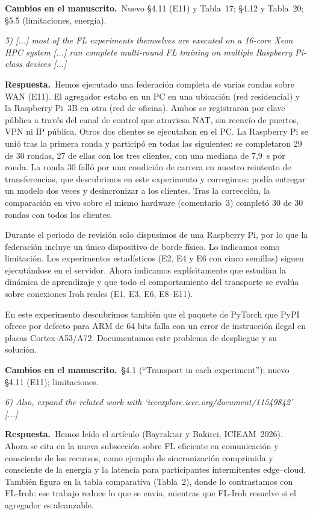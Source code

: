 \documentclass[11pt,a4paper]{article}
\newenvironment{comment}{\par\medskip\noindent\begin{minipage}{\linewidth}\color{blue!45!black}\itshape}{\end{minipage}\par}
\newcommand{\reply}{\par\smallskip\noindent\textbf{Respuesta.}~}
\newcommand{\changes}{\par\smallskip\noindent\textbf{Cambios en el manuscrito.}~}
\begin{document}
\changes Nuevo \S4.11 (E11) y Tabla~17; \S4.12 y Tabla~20; \S5.5 (limitaciones, energía).

\begin{comment}
5) [...] most of the FL experiments themselves are executed on a 16-core Xeon HPC system [...] run complete multi-round FL training on multiple Raspberry Pi-class devices [...]
\end{comment}
\reply Hemos ejecutado una federación completa de varias rondas sobre WAN (E11). El agregador estaba en un PC en una ubicación (red residencial) y la Raspberry Pi~3B en otra (red de oficina). Ambos se registraron por clave pública a través del canal de control que atraviesa NAT, sin reenvío de puertos, VPN ni IP pública. Otros dos clientes se ejecutaban en el PC. La Raspberry Pi se unió tras la primera ronda y participó en todas las siguientes: se completaron 29 de 30 rondas, 27 de ellas con los tres clientes, con una mediana de 7,9~s por ronda. La ronda 30 falló por una condición de carrera en nuestro reintento de transferencias, que descubrimos en este experimento y corregimos: podía entregar un modelo dos veces y desincronizar a los clientes. Tras la corrección, la comparación en vivo sobre el mismo hardware (comentario~3) completó 30 de 30 rondas con todos los clientes.

Durante el periodo de revisión solo dispusimos de una Raspberry Pi, por lo que la federación incluye un único dispositivo de borde físico. Lo indicamos como limitación. Los experimentos estadísticos (E2, E4 y E6 con cinco semillas) siguen ejecutándose en el servidor. Ahora indicamos explícitamente que estudian la dinámica de aprendizaje y que todo el comportamiento del transporte se evalúa sobre conexiones Iroh reales (E1, E3, E6, E8--E11).

En este experimento descubrimos también que el paquete de PyTorch que PyPI ofrece por defecto para ARM de 64 bits falla con un error de instrucción ilegal en placas Cortex-A53/A72. Documentamos este problema de despliegue y su solución.

\changes \S4.1 (``Transport in each experiment''); nuevo \S4.11 (E11); limitaciones.

\begin{comment}
6) Also, expand the related work with `ieeexplore.ieee.org/document/11549842' [...]
\end{comment}
\reply Hemos leído el artículo (Bayraktar y Bakirci, ICIEAM~2026). Ahora se cita en la nueva subsección sobre FL eficiente en comunicación y consciente de los recursos, como ejemplo de sincronización comprimida y consciente de la energía y la latencia para participantes intermitentes edge--cloud. También figura en la tabla comparativa (Tabla~2), donde lo contrastamos con FL-Iroh: ese trabajo reduce lo que se envía, mientras que FL-Iroh resuelve si el agregador es alcanzable.
\end{document}
